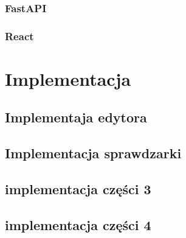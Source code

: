 \documentclass[a4paper,12pt,oneside]{book}
\theoremstyle{definition}
\begin{document}
\lipsum[1]

\lipsum[2]

\lipsum[3]

\subsection{FastAPI}

\lipsum[1]

\lipsum[2]

\lipsum[3]

\subsection{React}

\lipsum[1]

\lipsum[2]

\lipsum[3]

\chapter{Implementacja}

\section{Implementaja edytora}

\lipsum[1]

\lipsum[2]

\lipsum[3]

\section{Implementacja sprawdzarki}

\lipsum[1]

\lipsum[2]

\lipsum[3]

\section{implementacja  części 3}

\lipsum[1]

\lipsum[2]

\lipsum[3]

\section{implementacja  części 4}

\lipsum[1]

\lipsum[2]
\end{document}
